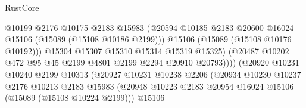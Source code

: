 \begin{lexlean}{RustCore}
\begin{coremodule}
                                          @10199
                                          @2176
                                          @10175
                                          @2183
                                          @15983
                                          (@20594
                                            @10185
                                            @2183
                                            @20600
                                            @16024
                                            @15106
                                            (@15089 (@15108 @10186 @2199)))
                                          @15106
                                          (@15089 (@15108 @10176 @10192)))
                                        @15304
                                        @15307
                                        @15310
                                        @15314
                                        @15319
                                        @15325)
                                      (@20487
                                        @10202
                                        @472
                                        @95
                                        @45
                                        @2199
                                        @4801
                                        @2199
                                        @2294
                                        @20910
                                        @20793))))
                                (@20920
                                  @10231
                                  @10240
                                  @2199
                                  @10313
                                  (@20927
                                    @10231
                                    @10238
                                    @2206
                                    (@20934
                                      @10230
                                      @10237
                                      @2176
                                      @10213
                                      @2183
                                      @15983
                                      (@20948
                                        @10223
                                        @2183
                                        @20954
                                        @16024
                                        @15106
                                        (@15089 (@15108 @10224 @2199)))
                                      @15106

\end{coremodule}
\end{lexlean}
